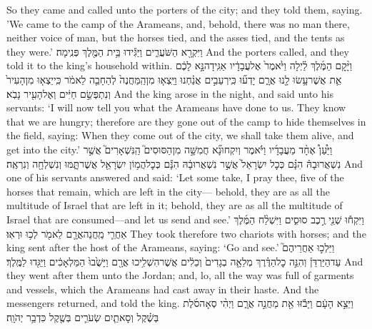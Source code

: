 {So they came and called unto the porters of the city; and they told them, saying. 'We came to the camp of the Arameans, and, behold, there was no man there, neither voice of man, but the horses tied, and the asses tied, and the tents as they were.’}
{וַיִּקְרָ֖א הַשֹּׁעֲרִ֑ים וַיַּגִּ֕ידוּ בֵּ֥ית הַמֶּ֖לֶךְ פְּנִֽימָה׃}
{And the porters called, and they told it to the king’s household within.}
{וַיָּ֨קׇם הַמֶּ֜לֶךְ לַ֗יְלָה וַיֹּ֙אמֶר֙ אֶל\maqqaf עֲבָדָ֔יו אַגִּֽידָה\maqqaf נָּ֣א לָכֶ֔ם אֵ֛ת אֲשֶׁר\maqqaf עָ֥שׂוּ לָ֖נוּ אֲרָ֑ם יָדְע֞וּ כִּֽי\maqqaf רְעֵבִ֣ים אֲנַ֗חְנוּ וַיֵּֽצְא֤וּ מִן\maqqaf הַֽמַּחֲנֶה֙ לְהֵחָבֵ֤ה  לֵאמֹ֔ר כִּֽי\maqqaf יֵצְא֤וּ מִן\maqqaf הָעִיר֙ וְנִתְפְּשֵׂ֣ם חַיִּ֔ים וְאֶל\maqqaf הָעִ֖יר נָבֹֽא׃}
{And the king arose in the night, and said unto his servants: ‘I will now tell you what the Arameans have done to us. They know that we are hungry; therefore are they gone out of the camp to hide themselves in the field, saying: When they come out of the city, we shall take them alive, and get into the city.’}
{וַיַּ֩עַן֩ אֶחָ֨ד מֵעֲבָדָ֜יו וַיֹּ֗אמֶר וְיִקְחוּ\maqqaf נָ֞א חֲמִשָּׁ֣ה מִן\maqqaf הַסּוּסִים֮ הַֽנִּשְׁאָרִים֮ אֲשֶׁ֣ר נִשְׁאֲרוּ\maqqaf בָהּ֒ הִנָּ֗ם כְּכׇל\maqqaf {} יִשְׂרָאֵל֙ אֲשֶׁ֣ר נִשְׁאֲרוּ\maqqaf בָ֔הּ הִנָּ֕ם כְּכׇל\maqqaf הֲמ֥וֹן יִשְׂרָאֵ֖ל אֲשֶׁר\maqqaf תָּ֑מּוּ וְנִשְׁלְחָ֖ה וְנִרְאֶֽה׃}
{And one of his servants answered and said: ‘Let some take, I pray thee, five of the horses that remain, which are left in the city— behold, they are as all the multitude of Israel that are left in it; behold, they are as all the multitude of Israel that are consumed—and let us send and see.’}
{וַיִּקְח֕וּ שְׁנֵ֖י רֶ֣כֶב סוּסִ֑ים וַיִּשְׁלַ֨ח הַמֶּ֜לֶךְ אַחֲרֵ֧י מַֽחֲנֵה\maqqaf אֲרָ֛ם לֵאמֹ֖ר לְכ֥וּ וּרְאֽוּ׃}
{They took therefore two chariots with horses; and the king sent after the host of the Arameans, saying: ‘Go and see.’}
{וַיֵּלְכ֣וּ אַחֲרֵיהֶם֮ עַד\maqqaf הַיַּרְדֵּן֒ וְהִנֵּ֣ה כׇל\maqqaf הַדֶּ֗רֶךְ מְלֵאָ֤ה בְגָדִים֙ וְכֵלִ֔ים אֲשֶׁר\maqqaf הִשְׁלִ֥יכוּ אֲרָ֖ם  וַיָּשֻׁ֙בוּ֙ הַמַּלְאָכִ֔ים וַיַּגִּ֖דוּ לַמֶּֽלֶךְ׃}
{And they went after them unto the Jordan; and, lo, all the way was full of garments and vessels, which the Arameans had cast away in their haste. And the messengers returned, and told the king.}
{וַיֵּצֵ֣א הָעָ֔ם וַיָּבֹ֕זּוּ אֵ֖ת מַחֲנֵ֣ה אֲרָ֑ם וַיְהִ֨י סְאָה\maqqaf סֹ֜לֶת בְּשֶׁ֗קֶל וְסָאתַ֧יִם שְׂעֹרִ֛ים בְּשֶׁ֖קֶל כִּדְבַ֥ר יְהֹוָֽה׃}
